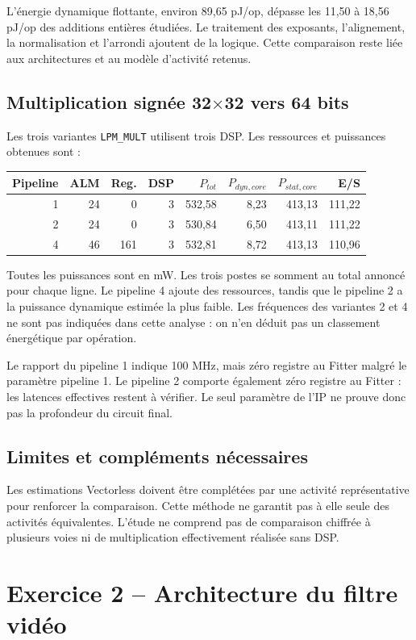 \documentclass[11pt,a4paper]{article}
\begin{document}
L'énergie dynamique flottante, environ 89,65 pJ/op, dépasse les 11,50 à 18,56 pJ/op des additions entières étudiées. Le traitement des exposants, l'alignement, la normalisation et l'arrondi ajoutent de la logique. Cette comparaison reste liée aux architectures et au modèle d'activité retenus.

\subsection{Multiplication signée 32$\times$32 vers 64 bits}
Les trois variantes \texttt{LPM\_MULT} utilisent trois DSP. Les ressources et puissances obtenues sont :
\begin{center}
\begin{tabular}{@{}rrrrrrrr@{}}
\toprule
Pipeline & ALM & Reg. & DSP & $P_{tot}$ & $P_{dyn,core}$ & $P_{stat,core}$ & E/S\\
\midrule
1 & 24 & 0 & 3 & 532,58 & 8,23 & 413,13 & 111,22\\
2 & 24 & 0 & 3 & 530,84 & 6,50 & 413,11 & 111,22\\
4 & 46 & 161 & 3 & 532,81 & 8,72 & 413,13 & 110,96\\
\bottomrule
\end{tabular}
\end{center}
Toutes les puissances sont en mW. Les trois postes se somment au total annoncé pour chaque ligne. Le pipeline 4 ajoute des ressources, tandis que le pipeline 2 a la puissance dynamique estimée la plus faible. Les fréquences des variantes 2 et 4 ne sont pas indiquées dans cette analyse : on n'en déduit pas un classement énergétique par opération.

Le rapport du pipeline 1 indique 100 MHz, mais zéro registre au Fitter malgré le paramètre pipeline 1. Le pipeline 2 comporte également zéro registre au Fitter : les latences effectives restent à vérifier. Le seul paramètre de l'IP ne prouve donc pas la profondeur du circuit final.

\subsection{Limites et compléments nécessaires}
Les estimations Vectorless doivent être complétées par une activité représentative pour renforcer la comparaison. Cette méthode ne garantit pas à elle seule des activités équivalentes. L'étude ne comprend pas de comparaison chiffrée à plusieurs voies ni de multiplication effectivement réalisée sans DSP.

\newpage
\endgroup\begingroup\small\section{Exercice 2 -- Architecture du filtre vidéo}
\end{document}
